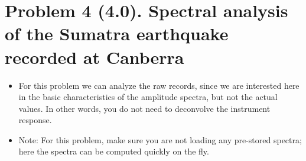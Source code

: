 \documentclass[11pt,titlepage,fleqn]{article}
\begin{document}

\pagebreak
\section*{Problem 4 (4.0). Spectral analysis of the Sumatra earthquake recorded at Canberra}

\begin{itemize}
\item For this problem we can analyze the raw records, since we are interested here in the basic characteristics of the amplitude spectra, but not the actual values. In other words, you do not need to deconvolve the instrument response.

\item Note: For this problem, make sure you are not loading any pre-stored spectra; here the spectra can be computed quickly on the fly.
\end{itemize}
\end{document}
